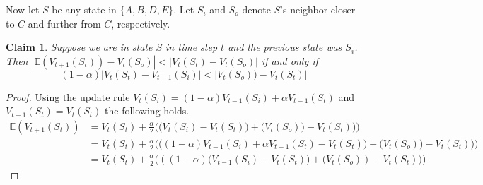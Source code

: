 \documentclass[12pt,a4paper]{article}
\newtheorem{claim}{Claim}
\begin{document}
\begin{enumerate}
Now let $S$ be any state in $\{A, B, D, E\}$. Let $S_i$ and $S_o$ denote $S$'s neighbor
closer to $C$ and further from $C$, respectively.

\begin{claim}
  Suppose we are in state $S$ in time step $t$ and the previous state was $S_i$. Then
  $|\mathbb{E}(V_{t + 1}(S_t)) - V_{t}(S_o)| < |V_t(S_t) - V_{t}(S_o)|$ if and only if
  \[
  (1 - \alpha) |V_t(S_t) - V_{t - 1} (S_i)| < |V_t(S_o)) - V_t(S_t)|
  \]
\end{claim}
\begin{proof}
  Using the update rule $ V_t(S_i) = (1 - \alpha) V_{t - 1}(S_i) + \alpha V_{t - 1}(S_t)$
  and $V_{t - 1}(S_t) = V_t(S_t)$ the following holds.
  \begin{align*}
  \mathbb{E}(V_{t + 1}(S_t)) &
  = V_t(S_t) + \frac{\alpha}{2} \Big(\big(V_t(S_i) - V_t(S_t)\big) + \big(V_t(S_o)) - V_t(S_t)\big)\Big)\\
  & = V_t(S_t) + \frac{\alpha}{2} \Big(\big((1 - \alpha) V_{t - 1}(S_i) +
  \alpha V_{t - 1}(S_t) - V_t(S_t)\big) + \big(V_t(S_o)) - V_t(S_t)\big)\Big)\\
  & = V_t(S_t) + \frac{\alpha}{2} \Big(((1 - \alpha) \big(V_{t - 1}(S_i) - V_t(S_t)\big)
  + \big(V_t(S_o)) - V_t(S_t)\big)\Big)
  \end{align*}
\end{proof}
\end{enumerate}
\end{document}
